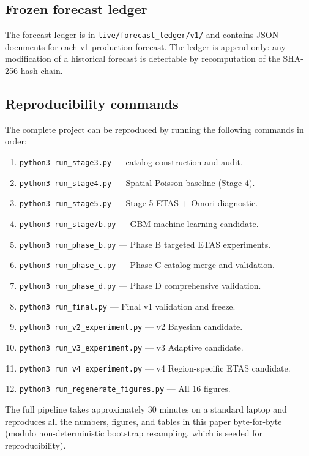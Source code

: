 \documentclass[10pt,a4paper,twocolumn]{article}
\begin{document}
\subsection{Frozen forecast ledger}

The forecast ledger is in \texttt{live/forecast\_ledger/v1/} and contains JSON documents for each v1 production forecast. The ledger is append-only: any modification of a historical forecast is detectable by recomputation of the SHA-256 hash chain.

\subsection{Reproducibility commands}

The complete project can be reproduced by running the following commands in order:

\begin{enumerate}[leftmargin=1.2em,itemsep=2pt,topsep=2pt]
\item \texttt{python3 run\_stage3.py} --- catalog construction and audit.
\item \texttt{python3 run\_stage4.py} --- Spatial Poisson baseline (Stage 4).
\item \texttt{python3 run\_stage5.py} --- Stage 5 ETAS + Omori diagnostic.
\item \texttt{python3 run\_stage7b.py} --- GBM machine-learning candidate.
\item \texttt{python3 run\_phase\_b.py} --- Phase B targeted ETAS experiments.
\item \texttt{python3 run\_phase\_c.py} --- Phase C catalog merge and validation.
\item \texttt{python3 run\_phase\_d.py} --- Phase D comprehensive validation.
\item \texttt{python3 run\_final.py} --- Final v1 validation and freeze.
\item \texttt{python3 run\_v2\_experiment.py} --- v2 Bayesian candidate.
\item \texttt{python3 run\_v3\_experiment.py} --- v3 Adaptive candidate.
\item \texttt{python3 run\_v4\_experiment.py} --- v4 Region-specific ETAS candidate.
\item \texttt{python3 run\_regenerate\_figures.py} --- All 16 figures.
\end{enumerate}

The full pipeline takes approximately 30 minutes on a standard laptop and reproduces all the numbers, figures, and tables in this paper byte-for-byte (modulo non-deterministic bootstrap resampling, which is seeded for reproducibility).
\end{document}
